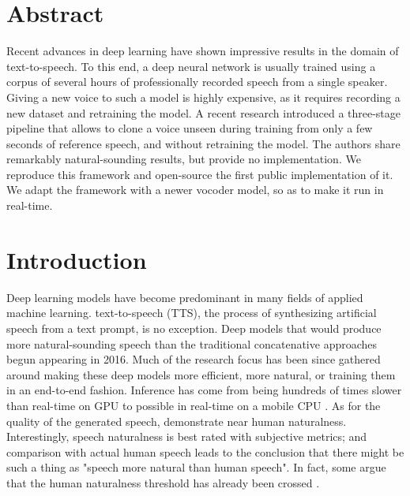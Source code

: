 \documentclass[a4paper, oneside, 12pt, english]{article}
\begin{document}
\section*{Abstract}
Recent advances in deep learning have shown impressive results in the domain of text-to-speech. To this end, a deep neural network is usually trained using a corpus of several hours of professionally recorded speech from a single speaker. Giving a new voice to such a model is highly expensive, as it requires recording a new dataset and retraining the model. A recent research introduced a three-stage pipeline that allows to clone a voice unseen during training from only a few seconds of reference speech, and without retraining the model. The authors share remarkably natural-sounding results, but provide no implementation. We reproduce this framework and open-source the first public implementation of it. We adapt the framework with a newer vocoder model, so as to make it run in real-time.
\clearpage

\tableofcontents
\clearpage

\section{Introduction}
Deep learning models have become predominant in many fields of applied machine learning. text-to-speech (TTS), the process of synthesizing artificial speech from a text prompt, is no exception. Deep models that would produce more natural-sounding speech than the traditional concatenative approaches begun appearing in 2016. Much of the research focus has been since gathered around making these deep models more efficient, more natural, or training them in an end-to-end fashion. Inference has come from being hundreds of times slower than real-time on GPU \citep{WaveNet} to possible in real-time on a mobile CPU \citep{WaveRNN}. As for the quality of the generated speech, \citet{Tacotron2} demonstrate near human naturalness. Interestingly, speech naturalness is best rated with subjective metrics; and comparison with actual human speech leads to the conclusion that there might be such a thing as "speech more natural than human speech". In fact, some argue that the human naturalness threshold has already been crossed \citep{MOSNaturalness}.
\end{document}

